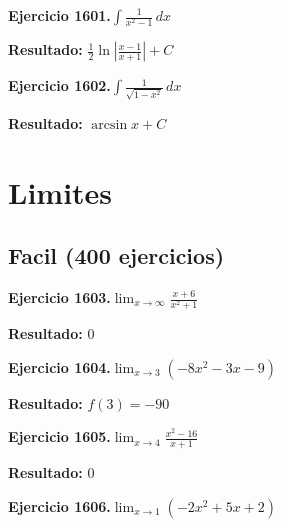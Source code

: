 \documentclass[10pt,a4paper]{article}
\begin{document}
\begin{ejbox}
\textbf{Ejercicio 1601.}\quad $\int \frac{1}{x^2-1}\,dx$
\end{ejbox}

\begin{solbox}
\textbf{Resultado:} \(\displaystyle \frac{1}{2}\ln\left|\frac{x-1}{x+1}\right| + C\)
\end{solbox}

\begin{ejbox}
\textbf{Ejercicio 1602.}\quad $\int \frac{1}{\sqrt{1-x^2}}\,dx$
\end{ejbox}

\begin{solbox}
\textbf{Resultado:} \(\displaystyle \arcsin x + C\)
\end{solbox}

\newpage
\newpage
\section{Limites}

\subsection{Facil (400 ejercicios)}

\begin{ejbox}
\textbf{Ejercicio 1603.}\quad $\lim_{x\to \infty} \frac{x + 6}{x^2 + 1}$
\end{ejbox}

\begin{solbox}
\textbf{Resultado:} \(\displaystyle 0\)
\end{solbox}

\begin{ejbox}
\textbf{Ejercicio 1604.}\quad $\lim_{x\to 3} (-8x^2 -3x -9)$
\end{ejbox}

\begin{solbox}
\textbf{Resultado:} \(\displaystyle f(3) = -90\)
\end{solbox}

\begin{ejbox}
\textbf{Ejercicio 1605.}\quad $\lim_{x\to 4} \frac{x^2-16}{x+1}$
\end{ejbox}

\begin{solbox}
\textbf{Resultado:} \(\displaystyle 0\)
\end{solbox}

\newpage
\begin{ejbox}
\textbf{Ejercicio 1606.}\quad $\lim_{x\to 1} (-2x^2 +5x +2)$
\end{ejbox}
\end{document}
